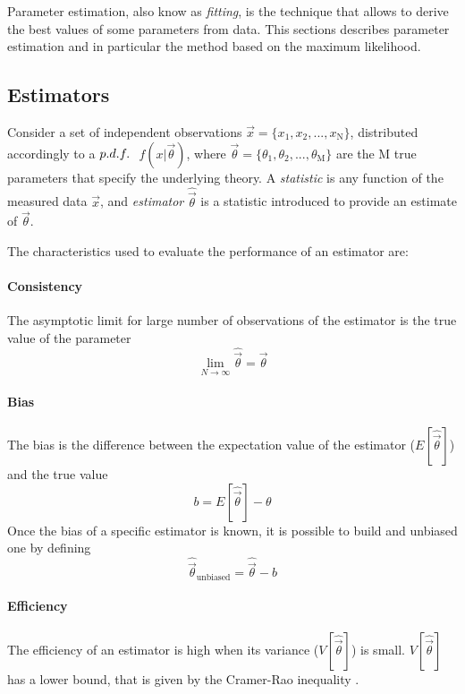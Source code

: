 Parameter estimation, also know as \textit{fitting}, is the technique that allows to derive the best values of some parameters from data.
This sections describes parameter estimation and in particular the method based on the maximum likelihood.

\subsection{Estimators}

Consider a set of independent observations $\vec{x}=\{x_1, x_2, ..., x_\mathrm{N}\}$, distributed accordingly to a $p.d.f. \ $ $f(x|\vec{\theta})$, where $\vec{\theta}=\{\theta_1, \theta_2, ..., \theta_\mathrm{M}\}$ are the M true parameters that specify the underlying theory. 
A \textit{statistic} is any function of the measured data $\vec{x}$, and \textit{estimator} $\hat{\vec{\theta}}$ is a statistic introduced to provide an estimate of $\vec{\theta}$.

The characteristics used to evaluate the performance of an estimator are:


\paragraph{Consistency}
The asymptotic limit for large number of observations of the estimator is the true value of the parameter 
\begin{equation}
\label{eq:stat:consistency}
\lim_{N \rightarrow \infty} \hat{\vec{\theta}} = \vec{\theta}
\end{equation}


\paragraph{Bias}
The bias is the difference between the expectation value of the estimator ($E[\hat{\vec{\theta}}]$) and the true value
\begin{equation}
\label{eq:stat:bias}
b = E[\hat{\vec{\theta}}] - \theta
\end{equation}
Once the bias of a specific estimator is known, it is possible to build and unbiased one by defining 
\begin{equation}
\hat{\vec{\theta}}_{\mathrm{unbiased}} = \hat{\vec{\theta}} - b
\end{equation}


\paragraph{Efficiency}
The efficiency of an estimator is high when its variance ($V[\hat{\vec{\theta}}]$) is small. $V[\hat{\vec{\theta}}]$ has a lower bound, that is given by the Cramer-Rao inequality \cite{Cramer1946}\cite{Rao1992}.

